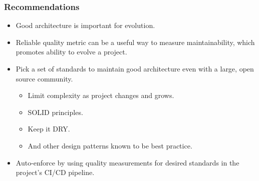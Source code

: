 \documentclass{beamer}
\begin{document}
\begin{frame}
  \frametitle{Recommendations}
  \begin{itemize}
    \item Good architecture is important for evolution.
    
    \vspace{0.35cm}    
    \item Reliable quality metric can be a useful way to measure maintainability, which promotes ability to evolve a project.
    
    \vspace{0.35cm}
    \item Pick a set of standards to maintain good architecture 
    \newline even with a large, open source community.
    \begin{itemize}
      \item Limit complexity as project changes and grows.
      \item SOLID principles.
      \item Keep it DRY.
      \item And other design patterns known to be best practice.
    \end{itemize}
    
    \vspace{0.35cm}
    \item Auto-enforce by using quality measurements for desired standards 
    \newline in the project's CI/CD pipeline.
  \end{itemize}
\end{frame}
\end{document}
